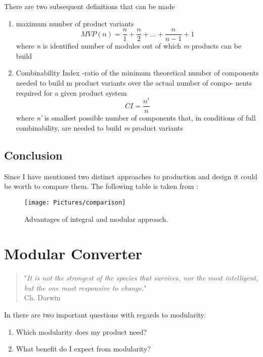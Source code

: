 \documentclass[]{scrartcl}
\begin{document}
There are two subsequent definitions that can be made
\begin{enumerate}
	\item maximum number of product variants
	\subitem
	\begin{equation}
	MVP(n) = \frac{n}{1} + \frac{n}{2}+\ldots+\frac{n}{n-1}+1
	\end{equation}
	where \emph{n} is identified number of modules out of which \emph{m} products can be build
	\item Combinability Index -ratio of the minimum theoretical number of components needed to build m product variants over the actual number of compo- nents required for a given product system
	\subitem 
	\begin{equation}
	CI = \frac{n'}{n}
	\end{equation}
	where \emph{n'} is smallest possible number of components that, in conditions of full combinability, are needed to build \emph{m} product variants
\end{enumerate}


\subsection{Conclusion}

Since I have mentioned two distinct approaches to production and design it could be worth to compare them. The following table is taken from \cite{JulianaHsuanMikkola2003}:
\begin{figure}[h!]
	\centering
	\texttt{[image: Pictures/comparison]}
	\caption{Advantages of integral and modular approach.}
	\label{fig:comparison}
\end{figure}




\newpage
\section{Modular Converter}
\begin{quote}
	"\emph{It is not the strongest of the species that survives, nor the most intelligent, but the one most responsive to change.}" \\
	Ch. Darwin \\
\end{quote}

In \cite{Bradshaw2015} there are two important questions with regards to modularity. 
\begin{enumerate}
	\item Which modularity does my product need?
	\item What benefit do I expect from modularity?
\end{enumerate}
\end{document}
